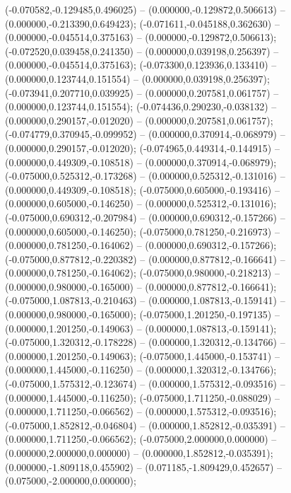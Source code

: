  (-0.070582,-0.129485,0.496025) -- (0.000000,-0.129872,0.506613) -- (0.000000,-0.213390,0.649423);
 (-0.071611,-0.045188,0.362630) -- (0.000000,-0.045514,0.375163) -- (0.000000,-0.129872,0.506613);
 (-0.072520,0.039458,0.241350) -- (0.000000,0.039198,0.256397) -- (0.000000,-0.045514,0.375163);
 (-0.073300,0.123936,0.133410) -- (0.000000,0.123744,0.151554) -- (0.000000,0.039198,0.256397);
 (-0.073941,0.207710,0.039925) -- (0.000000,0.207581,0.061757) -- (0.000000,0.123744,0.151554);
 (-0.074436,0.290230,-0.038132) -- (0.000000,0.290157,-0.012020) -- (0.000000,0.207581,0.061757);
 (-0.074779,0.370945,-0.099952) -- (0.000000,0.370914,-0.068979) -- (0.000000,0.290157,-0.012020);
 (-0.074965,0.449314,-0.144915) -- (0.000000,0.449309,-0.108518) -- (0.000000,0.370914,-0.068979);
 (-0.075000,0.525312,-0.173268) -- (0.000000,0.525312,-0.131016) -- (0.000000,0.449309,-0.108518);
 (-0.075000,0.605000,-0.193416) -- (0.000000,0.605000,-0.146250) -- (0.000000,0.525312,-0.131016);
 (-0.075000,0.690312,-0.207984) -- (0.000000,0.690312,-0.157266) -- (0.000000,0.605000,-0.146250);
 (-0.075000,0.781250,-0.216973) -- (0.000000,0.781250,-0.164062) -- (0.000000,0.690312,-0.157266);
 (-0.075000,0.877812,-0.220382) -- (0.000000,0.877812,-0.166641) -- (0.000000,0.781250,-0.164062);
 (-0.075000,0.980000,-0.218213) -- (0.000000,0.980000,-0.165000) -- (0.000000,0.877812,-0.166641);
 (-0.075000,1.087813,-0.210463) -- (0.000000,1.087813,-0.159141) -- (0.000000,0.980000,-0.165000);
 (-0.075000,1.201250,-0.197135) -- (0.000000,1.201250,-0.149063) -- (0.000000,1.087813,-0.159141);
 (-0.075000,1.320312,-0.178228) -- (0.000000,1.320312,-0.134766) -- (0.000000,1.201250,-0.149063);
 (-0.075000,1.445000,-0.153741) -- (0.000000,1.445000,-0.116250) -- (0.000000,1.320312,-0.134766);
 (-0.075000,1.575312,-0.123674) -- (0.000000,1.575312,-0.093516) -- (0.000000,1.445000,-0.116250);
 (-0.075000,1.711250,-0.088029) -- (0.000000,1.711250,-0.066562) -- (0.000000,1.575312,-0.093516);
 (-0.075000,1.852812,-0.046804) -- (0.000000,1.852812,-0.035391) -- (0.000000,1.711250,-0.066562);
 (-0.075000,2.000000,0.000000) -- (0.000000,2.000000,0.000000) -- (0.000000,1.852812,-0.035391);
 (0.000000,-1.809118,0.455902) -- (0.071185,-1.809429,0.452657) -- (0.075000,-2.000000,0.000000);
